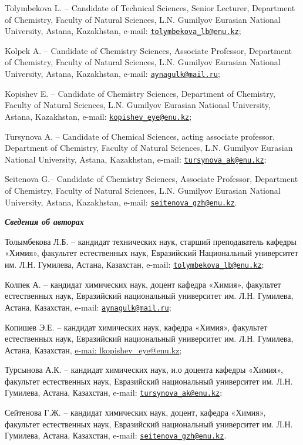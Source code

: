 Tolymbekova L. -- Candidate of Technical Sciences, Senior Lecturer,
Department of Chemistry, Faculty of Natural Sciences, L.N. Gumilyov
Eurasian National University, Astana, Kazakhstan, e-mail:
\href{mailto:tolymbekova_lb@enu.kz}{\nolinkurl{tolymbekova\_lb@enu.kz}};

Kolpek A. -- Candidate of Chemistry Sciences, Associate Professor,
Department of Chemistry, Faculty of Natural Sciences, L.N. Gumilyov
Eurasian National University, Astana, Kazakhstan, e-mail:
\href{mailto:aynagulk@mail.ru}{\nolinkurl{aynagulk@mail.ru}};

Kopishev E. -- Candidate of Chemistry Sciences, Department of Chemistry,
Faculty of Natural Sciences, L.N. Gumilyov Eurasian National University,
Astana, Kazakhstan, e-mail:
\href{mailto:kopishev_eye@enu.kz}{\nolinkurl{kopishev\_eye@enu.kz}};

Tursynova A. -- Сandidate of Chemical Sciences, acting associate
professor, Department of Chemistry, Faculty of Natural Sciences, L.N.
Gumilyov Eurasian National University, Astana, Kazakhstan, e-mail:
\href{mailto:tursynova_ak@enu.kz}{\nolinkurl{tursynova\_ak@enu.kz}};

Seitenova G.-- Candidate of Chemistry Sciences, Associate Professor,
Department of Chemistry, Faculty of Natural Sciences, L.N. Gumilyov
Eurasian National University, Astana, Kazakhstan, e-mail:
\href{mailto:seitenova_gzh@enu.kz}{\nolinkurl{seitenova\_gzh@enu.kz}}.

\emph{{\bfseries Сведения об авторах}}

Толымбекова Л.Б. -- кандидат технических наук, старший преподаватель
кафедры «Химия», факультет естественных наук, Евразийский Национальный
университет им. Л.Н. Гумилева, Астана, Казахстан, e-mail:
\href{mailto:tolymbekova_lb@enu.kz}{\nolinkurl{tolymbekova\_lb@enu.kz}};

Колпек А. -- кандидат химических наук, доцент кафедра «Химия», факультет
естественных наук, Евразийский национальный университет им. Л.Н.
Гумилева, Астана, Казахстан, e-mail:
\href{mailto:aynagulk@mail.ru}{\nolinkurl{aynagulk@mail.ru}};

Копишев Э.Е. -- кандидат химических наук, кафедра «Химия», факультет
естественных наук, Евразийский национальный университет им. Л.Н.
Гумилева, Астана, Казахстан,
\href{mailto:e-mai:\%20lkopishev_eye@enu.kz}{e-mai:
lkopishev\_eye@enu.kz};

Турсынова А.К. -- кандидат химических наук, и.о доцента кафедры «Химия»,
факультет естественных наук, Евразийский национальный университет им.
Л.Н. Гумилева, Астана, Казахстан, e-mail:
\href{mailto:tursynova_ak@enu.kz}{\nolinkurl{tursynova\_ak@enu.kz}};

Сейтенова Г.Ж. -- кандидат химических наук, доцент, кафедра «Химия»,
факультет естественных наук, Евразийский национальный университет им.
Л.Н. Гумилева, Астана, Казахстан, e-mail:
\href{mailto:seitenova_gzh@enu.kz}{\nolinkurl{seitenova\_gzh@enu.kz}}.\
